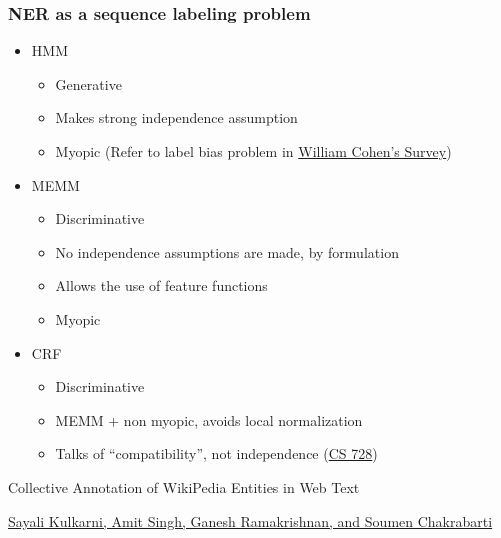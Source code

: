 \documentclass{beamer}
\begin{document}
\begin{frame}
 \frametitle{NER as a sequence labeling problem}
 \begin{itemize}
 \item HMM 
 \begin{itemize}
 \item Generative
 \item Makes strong independence assumption
 \item Myopic (Refer to label bias problem in \hyperref[thesurvey]{William Cohen's Survey})
 \end{itemize}
 
 \item MEMM
 \begin{itemize}
 \item Discriminative
 \item No independence assumptions are made, by formulation
 \item Allows the use of feature functions
 \item Myopic
 \end{itemize}
 
 \item CRF
 \begin{itemize}
  \item Discriminative
  \item MEMM + non myopic, avoids local normalization
  \item Talks of ``compatibility'', not independence (\hyperref[thesite]{CS 728})
 \end{itemize}

 
 \end{itemize}
 
\end{frame}




\begin{frame}
 \begin{center}
 
  Collective Annotation of WikiPedia Entities in Web Text 
  
  \bigskip
  
 \hyperref[thepaper]{ Sayali Kulkarni, Amit Singh, Ganesh Ramakrishnan, and Soumen Chakrabarti}
  \end{center}

\end{frame}
\end{document}
